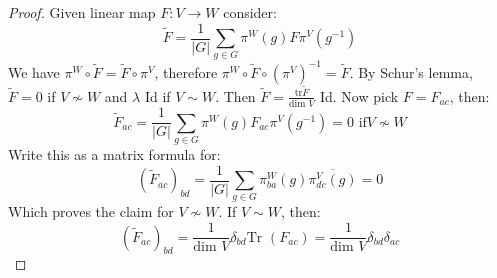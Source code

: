 \documentclass[12 pt]{article}
\theoremstyle{plain}
\theoremstyle{definition}
\theoremstyle{remark}
\begin{document}
\begin{proof}
Given linear map $F:V \to W$ consider:
\[    \tilde F = \frac{1}{|G|} \sum_{g\in G} \pi^{W}(g) F \pi^V(g^{-1})     \]
We have $\pi^W \circ \tilde F = \tilde F \circ \pi^V$, therefore $\pi^W \circ \tilde F\circ (\pi^V)^{-1} = \tilde F$.
By Schur's lemma, $\tilde F = 0$ if $V \not \sim W$ and $\lambda$ Id if $V \sim W$. Then $\tilde F = \frac{\text{tr} \tilde F}{\text{dim } V} $ Id. Now pick $F = F_{ac}$, then:
\[    \tilde F_{ac} = \frac{1}{|G|} \sum_{g\in G} \pi^W (g) F_{ac} \pi^V(g^{-1}) = 0 \text{   if} V\not \sim W  \]
Write this as a matrix formula for:
\[     (\tilde F_{ac})_{bd} = \frac{1}{|G|} \sum_{g\in G} \pi^W_{ba}(g) \overline{\pi^V_{dc}(g)}  = 0   \]
Which proves the claim for $V \not \sim W$. If $V\sim W$, then:
\[      (\tilde F_{ac})_{bd} = \frac{1}{\text{dim }V} \delta_{bd} \text{Tr }(F_{ac}) = \frac{1}{\text{dim }V} \delta_{bd}\delta_{ac}   \]
\end{proof}
\end{document}
